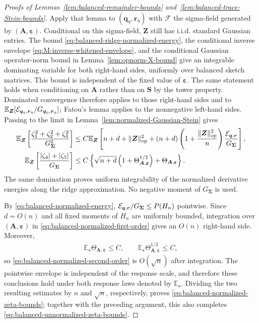 \documentclass{article}
\theoremstyle{plain}
\theoremstyle{definition}
\theoremstyle{definition}
\DeclarePairedDelimiter\norm{\lVert}{\rVert}
\def\E{{\mathbb{E}}}
\def\mathbold{\boldsymbol}
\def\cal{\mathcal}
\def\bA{\mathbold{A}}\def\calA{{\cal A}}\def\scrA{{\mathscr A}}\def\Ahat{\widehat{A}}\def\Atil{{\widetilde A}}
\def\bq{\mathbold{q}}\def\qhat{\widehat{q}}\def\qtil{\widetilde{q}}\def\qbar{{\overline q}}
\def\br{\mathbold{r}}\def\rhat{\widehat{r}}\def\rtil{\widetilde{r}}\def\rbar{{\overline r}}
\def\bS{\mathbold{S}}\def\hbS{{\widehat{\bS}}}\def\tbS{{\widetilde{\bS}}}
\def\bZ{\mathbold{Z}}\def\hbZ{{\widehat{\bZ}}}\def\tbZ{{\widetilde{\bZ}}}
\def\ep{\varepsilon}\def\eps{\epsilon}\def\veps{\varepsilon}
\def\bep{ {\mathbold{\ep} }}
\def\bSigma{\mathbold{\Sigma}}\def\hbSigma{{\widehat{\bSigma}}}
\begin{document}
\begin{proof}[Proofs of Lemmas~\ref{lem:balanced-remainder-bounds}
and~\ref{lem:balanced-trace-Stein-bounds}]
Apply that lemma to $(\bq_\eta,\br_\eta)$ with
$\mathcal F$ the sigma-field generated by $(\bA,\bep)$.  Conditional on this
sigma-field, $\bZ$ still has i.i.d. standard Gaussian entries.  The bound
\eqref{eq:balanced-ridge-normalized-energy},
the conditional inverse envelope
\eqref{eq:M-inverse-whitened-envelope}, and the conditional Gaussian
operator-norm bound in Lemma~\ref{lem:opnorm-X-bound} give an integrable
dominating variable for both right-hand sides, uniformly over balanced
sketch matrices. This bound is independent of the fixed value of
$\bep$. The same statement holds when
conditioning on $\bA$ rather than on $\bS$ by the tower property.
Dominated convergence therefore applies to those right-hand sides and to
$\E_{\bZ}[\calE_{\bq_\eta,\br_\eta}/G_{\bq_\eta,\br_\eta}]$;
Fatou's lemma applies to the nonnegative
left-hand sides. Passing to the limit in
Lemma~\ref{lem:normalized-Gaussian-Stein} gives
\begin{align}
    \E_{\bZ}\left[
       \frac{\zeta_1^2+\zeta_2^2+\zeta_3^2}{G_{\bSigma}^2}
    \right]
    &\leq C\E_{\bZ}\left[
       n+d+\norm{\bZ}_{\rm op}^2
       +(n+d)\left(1+\frac{\norm{\bZ}_{\rm op}^2}{n}\right)
          \frac{\calE_{\bq,\br}}{G_{\bSigma}}
    \right],
    \label{eq:balanced-normalized-first-order}\\
    \E_{\bZ}\left[
       \frac{|\zeta_4|+|\zeta_5|}{G_{\bSigma}}
    \right]
    &\leq C\left\{
       \sqrt{n+d}\left(1+\Theta_{\bA,\bep}^{1/2}\right)
       +\Theta_{\bA,\bep}
    \right\}.
    \label{eq:balanced-normalized-second-order}
\end{align}
The same domination proves uniform integrability of the normalized derivative
energies along the ridge approximation.  No negative moment of
$G_{\bSigma}$ is used.

By \eqref{eq:balanced-normalized-energy},
$\calE_{\bq,\br}/G_{\bSigma}\leq P(H_n)$ pointwise.
Since $d=O(n)$ and all fixed
moments of $H_n$ are uniformly bounded, integration over $(\bA,\bep)$ in
\eqref{eq:balanced-normalized-first-order} gives an $O(n)$ right-hand side.
Moreover,
\begin{align*}
    \E_\star\Theta_{\bA,\bep}\leq C,
    \qquad
    \E_\star\Theta_{\bA,\bep}^{1/2}\leq C,
\end{align*}
so \eqref{eq:balanced-normalized-second-order} is $O(\sqrt n)$ after
integration.  The pointwise envelope is independent of the response scale,
and therefore these conclusions hold under both response laws denoted by
$\E_\star$.  Dividing the two resulting estimates by $n$ and $\sqrt n$,
respectively, proves \eqref{eq:balanced-normalized-zeta-bounds}; together with
the preceding argument, this also completes
\eqref{eq:balanced-unnormalized-zeta-bounds}.


\end{proof}
\end{document}
